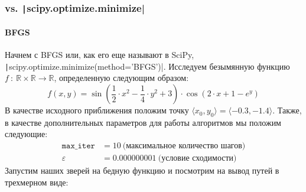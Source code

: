 \documentclass[12pt, a4paper, oneside, final]{article}
\begin{document}
	\subsubsection*{vs. \texttt|scipy.optimize.minimize|}
	\paragraph{BFGS}
	Начнем с BFGS или, как его еще называют в SciPy, \texttt|scipy.optimize.minimize(method='BFGS')|.
	Исследуем безымянную функцию $f\ :\ \mathbb{R} \times \mathbb{R} \to \mathbb{R}$, определенную следующим образом:
	\[
		f(x, y) = \sin{\left(\dfrac{1}{2} \cdot x^2 - \dfrac{1}{4} \cdot y^2 + 3\right) \cdot \cos{\left(2 \cdot x + 1 - e^{y}\right)}}
	\]
	В качестве исходного приближения положим точку $\langle x_0, y_0 \rangle = \langle -0.3, -1.4 \rangle$.
	Также, в качестве дополнительных параметров для работы алгоритмов мы положим следующие:
	\begin{align*}
		\mathtt{max\_iter} &= 10~\text{(максимальное количество шагов)} \\
		\varepsilon &= 0.000000001~\text{(условие сходимости)}
	\end{align*}
	Запустим наших зверей на бедную функцию и посмотрим на вывод путей в трехмерном виде:
\end{document}
